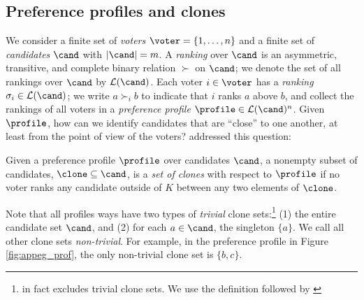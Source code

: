 \subsection{Preference profiles and clones}\label{appsubsec:clones}
We consider a finite set of \textit{voters} $\voter = \{1,\ldots, n\}$ and a finite set of \textit{candidates} $\cand$ with $|\cand|=m$. A {\em ranking} over $\cand$
is an asymmetric, transitive, and complete binary relation $\succ$ on $\cand$; we denote the set of all rankings over $\cand$ by $\mathcal{L}(\cand)$.
Each voter $i \in \voter$ has a \textit{ranking} $\sigma_i \in \mathcal{L}(\cand)$; we 
write $a \succ_i b$ to indicate that $i$ ranks $a$
above $b$, and collect the rankings of all voters in
a \textit{preference profile} $\profile \in \mathcal{L}(\cand)^n$. Given $\profile$, how can we identify candidates that are ``close'' to one another, at least from the point of view of the voters?  \citet{Tideman87:Independence} addressed this question:
\begin{definition}\label{appdef:clones}
Given a preference profile $\profile$ over candidates $\cand$, a nonempty subset of candidates, $\clone \subseteq \cand$, is a \emph{set of clones} with respect to $\profile$ if no voter ranks any candidate outside of $K$ between any two elements of $\clone$.
\end{definition}
Note that all profiles ways have two types of \textit{trivial} clone sets:\footnote{\citet{Tideman87:Independence} in fact excludes trivial clone sets. We use the definition followed by \citet{Elkind10:Clone}} (1) the entire candidate set $\cand$, and (2) for each $a\in \cand$, the singleton $\{a\}$. We call all other clone sets \textit{non-trivial}. For example, in the preference profile in Figure \ref{fig:appeg_prof}, the only non-trivial clone set is $\{b,c\}$.

